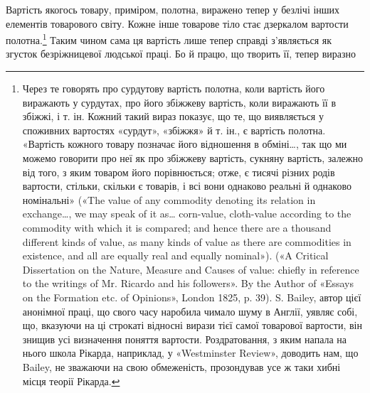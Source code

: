Вартість якогось товару, приміром, полотна, виражено тепер
у безлічі інших елементів товарового світу. Кожне інше товарове
тіло стає дзеркалом вартости полотна.\footnote{
Через те говорять про сурдутову вартість полотна, коли вартість
його виражають у сурдутах, про його збіжжеву вартість, коли виражають
її в збіжжі, і т. ін. Кожний такий вираз показує, що те, що виявляється
у споживних вартостях «сурдут», «збіжжя» й т. ін., є вартість полотна.
«Вартість кожного товару позначає його відношення в обміні\dots{},
так що ми можемо говорити про неї як про збіжжеву вартість, сукняну
вартість, залежно від того, з яким товаром його порівнюється; отже, є
тисячі різних родів вартости, стільки, скільки є товарів, і всі вони однаково
реальні й однаково номінальні» («The value of any commodity denoting
its relation in exchange\dots{}, we may speak of it as\dots{} corn-value,
cloth-value according to the commodity with which it is compared; and
hence there are a thousand different kinds of value, as many kinds
of value as there are commodities in existence, and all are equally real
and equally nominal»). («A Critical Dissertation on the Nature, Measure
and Causes of value: chiefly in reference to the writings of Mr. Ricardo
and his followers». By the Author of «Essays on the Formation etc. of Opinions»,
London 1825, p. 39). S. Bailey, автор цієї анонімної праці, що
свого часу наробила чимало шуму в Англії, уявляє собі, що, вказуючи
на ці строкаті відносні вирази тієї самої товарової вартости, він знищив
усі визначення поняття вартости. Роздратовання, з яким напала на нього
школа Рікарда, наприклад, у «Westminster Review», доводить нам, що
Bailey, не зважаючи на свою обмеженість, прозондував усе ж таки
хибні місця теорії Рікарда.
} Таким чином сама ця
вартість лише тепер справді з’являється як згусток безріжницевої
людської праці. Бо й працю, що творить її, тепер виразно
\parbreak{}  %
